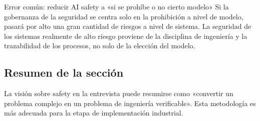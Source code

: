 \begin{warningbox}{Error común: reducir AI safety a «si se prohíbe o no cierto modelo»}
Si la gobernanza de la seguridad se centra solo en la prohibición a nivel de modelo, pasará por alto una gran cantidad de riesgos a nivel de sistema. La seguridad de los sistemas realmente de alto riesgo proviene de la disciplina de ingeniería y la trazabilidad de los procesos, no solo de la elección del modelo.
\end{warningbox}

\subsection{Resumen de la sección}
La visión sobre safety en la entrevista puede resumirse como «convertir un problema complejo en un problema de ingeniería verificable». Esta metodología es más adecuada para la etapa de implementación industrial.

